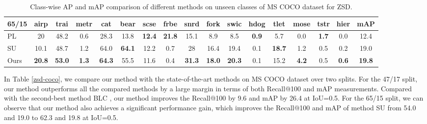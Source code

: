 \documentclass[10pt,twocolumn,letterpaper]{article}
\begin{document}
\begin{table*}[t]
  \centering

  \caption{Class-wise AP and mAP comparison of different methods on unseen classes of MS COCO dataset for ZSD.}
\renewcommand\tabcolsep{5.2pt}
    \begin{tabular}{lcccccccccccccccc}
    \toprule
    65/15 & \multicolumn{1}{c}{airp} & \multicolumn{1}{c}{trai} & \multicolumn{1}{c}{metr} & \multicolumn{1}{c}{cat} & \multicolumn{1}{c}{bear} & \multicolumn{1}{c}{scse} & \multicolumn{1}{c}{frbe} & \multicolumn{1}{c}{snrd} & \multicolumn{1}{c}{fork} & \multicolumn{1}{c}{swic} & \multicolumn{1}{c}{hdog} & \multicolumn{1}{c}{tlet} & \multicolumn{1}{c}{mose} & \multicolumn{1}{c}{tstr} & \multicolumn{1}{c}{hier} & \multicolumn{1}{c}{mAP} \\
    \midrule
    PL \cite{rahman2020improved}   & \multicolumn{1}{c}{20} & \multicolumn{1}{c}{48.2} & \multicolumn{1}{c}{0.6} & \multicolumn{1}{c}{28.3} & \multicolumn{1}{c}{13.8} & \multicolumn{1}{c}{\textbf{12.4}} & \multicolumn{1}{c}{\textbf{21.8}} & \multicolumn{1}{c}{15.1} & \multicolumn{1}{c}{8.9} & \multicolumn{1}{c}{8.5} & \multicolumn{1}{c}{\textbf{0.9}} & \multicolumn{1}{c}{5.7} & \multicolumn{1}{c}{0.0} & \multicolumn{1}{c}{\textbf{1.7}} & \multicolumn{1}{c}{0.0} & \multicolumn{1}{c}{12.4} \\
    SU  \cite{hayat2020synthesizing}  & \multicolumn{1}{c}{10.1} & \multicolumn{1}{c}{48.7} & \multicolumn{1}{c}{1.2} & \multicolumn{1}{c}{64.0} & \multicolumn{1}{c}{\textbf{64.1}} & \multicolumn{1}{c}{12.2} & \multicolumn{1}{c}{0.7} & \multicolumn{1}{c}{28} & \multicolumn{1}{c}{16.4} & \multicolumn{1}{c}{19.4} & \multicolumn{1}{c}{0.1} & \multicolumn{1}{c}{\textbf{18.7}} & \multicolumn{1}{c}{1.2} & \multicolumn{1}{c}{0.5} & \multicolumn{1}{c}{0.2} & \multicolumn{1}{c}{19.0} \\
    Ours  &\textbf{20.8}      & \textbf{53.0}     & \textbf{1.3}      & \textbf{64.3}      &55.5       & 11.6      & 0.4      & \textbf{31.3}      & \textbf{18.0}      &\textbf{20.3}       &0.1       & 15.2      &\textbf{4.2}       &0.5       &\textbf{0.6}       &\textbf{19.8}  \\
    \bottomrule
    \end{tabular}\label{clase-wise-AP-coco}\end{table*}

In Table \ref{zsd-coco}, we compare our method with the state-of-the-art methods on MS COCO dataset over two splits. For the 47/17 split, our method outperforms all the compared methods by a large margin in terms of both Recall@100 and mAP measurements. Compared with the second-best method BLC \cite{zheng2020background}, our method improves the Recall@100 by 9.6  and mAP by 26.4  at IoU=0.5. For the 65/15 split, we can observe that our method also achieves a significant performance gain, which improves the Recall@100 and mAP of method SU \cite{hayat2020synthesizing} from 54.0  and 19.0  to 62.3  and 19.8  at IoU=0.5.
\end{document}
